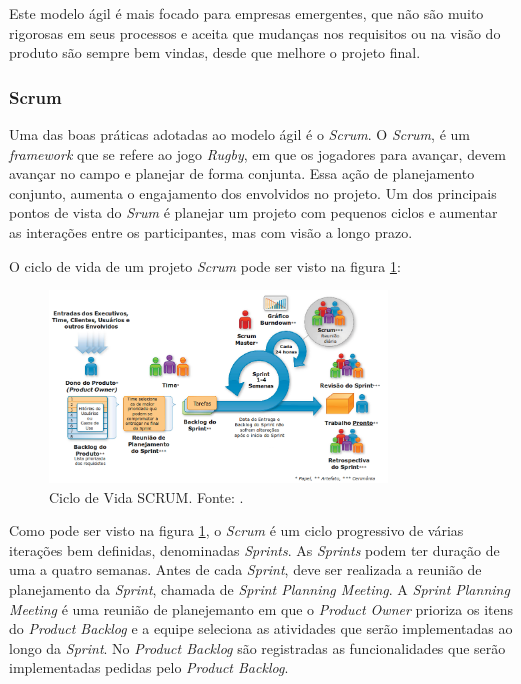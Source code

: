 Este modelo ágil é mais focado para empresas emergentes, que não são muito rigorosas em seus processos e aceita que mudanças nos requisitos ou na visão do produto são sempre bem vindas, desde que melhore o projeto final.

\subsubsection{Scrum}
\label{sec:scrum}

Uma das boas práticas adotadas ao modelo ágil é o \textit{Scrum}. O \textit{Scrum}, é um \textit{framework} que se refere ao jogo \textit{Rugby}, em que os jogadores para avançar, devem avançar no campo e planejar de forma conjunta. Essa ação de planejamento conjunto, aumenta o engajamento dos envolvidos no projeto. Um dos principais pontos de vista do \textit{Srum} é planejar um projeto com pequenos ciclos e aumentar as interações entre os participantes, mas com visão a longo prazo.

O ciclo de vida de um projeto \textit{Scrum} pode ser visto na figura \ref{img:ciclo_de_vida_scrum}:

\begin{figure}[H]
	\centering
	\includegraphics[width=0.8\textwidth]{figuras/ciclo_de_vida_scrum.png}
	\caption{Ciclo de Vida SCRUM. Fonte: .}
	\label{img:ciclo_de_vida_scrum}
\end{figure}

Como pode ser visto na figura \ref{img:ciclo_de_vida_scrum}, o \textit{Scrum} é um ciclo progressivo de várias iterações bem definidas, denominadas \textit{Sprints}. As \textit{Sprints} podem ter duração de uma a quatro semanas. Antes de cada \textit{Sprint}, deve ser realizada a reunião de planejamento da \textit{Sprint}, chamada de \textit{Sprint Planning Meeting}. A \textit{Sprint Planning Meeting} é uma reunião de planejemanto em que o \textit{Product Owner}
prioriza os itens do \textit{Product Backlog} e a equipe seleciona as atividades que serão implementadas ao longo da \textit{Sprint}. No \textit{Product Backlog} são registradas as funcionalidades que serão implementadas pedidas pelo \textit{Product Backlog}. 

